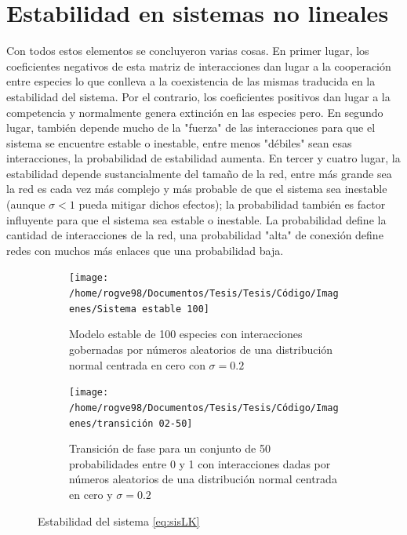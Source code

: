 \documentclass[11pt,a4paper]{article}
\begin{document}
\section{Estabilidad en sistemas no lineales}

Con todos estos elementos se concluyeron varias cosas. En primer lugar, los coeficientes negativos de esta matriz de interacciones dan lugar a la cooperación entre especies lo que conlleva a la coexistencia de las mismas traducida en la estabilidad del sistema. Por el contrario, los coeficientes positivos dan lugar a la competencia y normalmente genera extinción en las especies pero. En segundo lugar, también depende mucho de la "fuerza" de las interacciones para que el sistema se encuentre estable o inestable, entre menos "débiles" sean esas interacciones, la probabilidad de estabilidad aumenta. En tercer y cuatro lugar, la estabilidad depende sustancialmente del tamaño de la red, entre más grande sea la red es cada vez más complejo y más probable de que el sistema sea inestable (aunque $\sigma<1$ pueda mitigar dichos efectos); la probabilidad también es factor influyente para que el sistema sea estable o inestable. La probabilidad define la cantidad de interacciones de la red, una probabilidad "alta" de conexión define redes con muchos más enlaces que una probabilidad baja.
\begin{figure}[h!]
        \centering
        \begin{subfigure}[h]{0.5\textwidth} 
            \texttt{[image: /home/rogve98/Documentos/Tesis/Tesis/Código/Imagenes/Sistema estable 100]}
            \caption{Modelo estable de 100 especies con interacciones gobernadas por números aleatorios de una distribución normal centrada en cero con $\sigma=0.2$}
            \label{fig:Sistema}
        \end{subfigure} 
        \hfill 
        \begin{subfigure}[h]{0.49\textwidth} 
            \texttt{[image: /home/rogve98/Documentos/Tesis/Tesis/Código/Imagenes/transición 02-50]}
            \caption{Transición de fase para un conjunto de 50 probabilidades entre 0 y 1 con interacciones dadas por números aleatorios de una distribución normal centrada en cero y $\sigma=0.2$}
            \label{fig:transicion}
        \end{subfigure}
        \caption{Estabilidad del sistema \ref{eq:sisLK}}
\end{figure}
\end{document}
